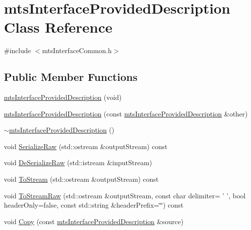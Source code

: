 \hypertarget{classmts_interface_provided_description}{\section{mts\-Interface\-Provided\-Description Class Reference}
\label{classmts_interface_provided_description}
}


{\ttfamily \#include $<$mts\-Interface\-Common.\-h$>$}

\subsection*{Public Member Functions}
\begin{DoxyCompactItemize}
\item 
\hyperlink{classmts_interface_provided_description_aa7d7892ab9cfd0a937c793aa4017f323}{mts\-Interface\-Provided\-Description} (void)
\item 
\hyperlink{classmts_interface_provided_description_a6b80527837f110b297cad1eb04ae2b5e}{mts\-Interface\-Provided\-Description} (const \hyperlink{classmts_interface_provided_description}{mts\-Interface\-Provided\-Description} \&other)
\item 
\hyperlink{classmts_interface_provided_description_a9f42a0d44f11a1c907b212eac95dce03}{$\sim$mts\-Interface\-Provided\-Description} ()
\item 
void \hyperlink{classmts_interface_provided_description_a4f2fc41b4a594f2e29126af5953e9adc}{Serialize\-Raw} (std\-::ostream \&output\-Stream) const 
\item 
void \hyperlink{classmts_interface_provided_description_a22c537e81fee36814c31c70963960076}{De\-Serialize\-Raw} (std\-::istream \&input\-Stream)
\item 
void \hyperlink{classmts_interface_provided_description_ae9add2d515deb3ee86ee578000184ac2}{To\-Stream} (std\-::ostream \&output\-Stream) const 
\item 
void \hyperlink{classmts_interface_provided_description_a21b511f570e6c241ee9078d9a89b57c2}{To\-Stream\-Raw} (std\-::ostream \&output\-Stream, const char delimiter= ' ', bool header\-Only=false, const std\-::string \&header\-Prefix=\char`\"{}\char`\"{}) const 
\item 
void \hyperlink{classmts_interface_provided_description_a2432361981dc3343eeef4720248e025b}{Copy} (const \hyperlink{classmts_interface_provided_description}{mts\-Interface\-Provided\-Description} \&source)
\item 

\end{DoxyCompactItemize}
